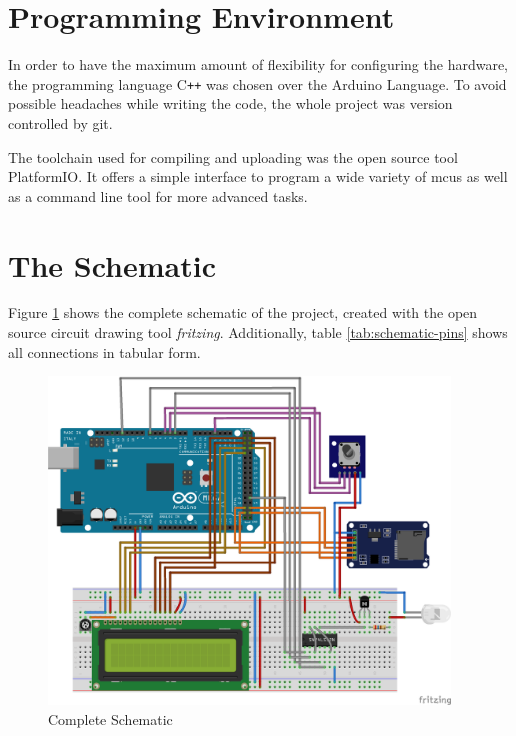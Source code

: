 \section{Programming Environment}

In order to have the maximum amount of flexibility for configuring the hardware, the programming language C\texttt{++} was chosen over the Arduino Language. To avoid possible headaches while writing the code, the whole project was version controlled by git.

The toolchain used for compiling and uploading was the open source tool PlatformIO. It offers a simple interface to program a wide variety of \glspl{mcu} as well as a command line tool for more advanced tasks.

\newpage
\section{The Schematic}

Figure \ref{fig:fritzing} shows the complete schematic of the project, created with the open source circuit drawing tool \emph{fritzing}. Additionally, table \ref{tab:schematic-pins} shows all connections in tabular form.

\begin{figure}[h!]
    \centering
    \includegraphics[width=0.95\textwidth]{felix/resources/fritzing.png}
    \caption{Complete Schematic}
    \label{fig:fritzing}
\end{figure}

